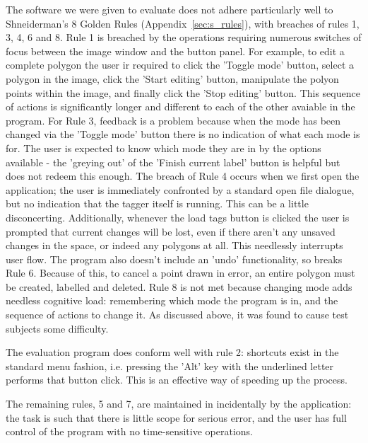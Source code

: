 \documentclass[a4paper,11pt,oneside]{article}
\begin{document}
The software we were given to evaluate does not adhere particularly well to Shneiderman's 8 Golden Rules (Appendix~\ref{sec:s_rules}), with breaches of rules 1, 3, 4, 6 and 8. Rule 1 is breached by the operations requiring numerous switches of focus between the image window and the button panel. For example, to edit a complete polygon the user ir required to click the 'Toggle mode' button, select a polygon in the image, click the 'Start editing' button, manipulate the polyon points within the image, and finally click the 'Stop editing' button. This sequence of actions is significantly longer and different to each of the other avaiable in the program. For Rule 3, feedback is a problem because when the mode has been changed via the 'Toggle mode' button there is no indication of what each mode is for. The user is expected to know which mode they are in by the options available - the 'greying out' of the 'Finish current label' button is helpful but does not redeem this enough. The breach of Rule 4 occurs when we first open the application; the user is immediately confronted by a standard open file dialogue, but no indication that the tagger itself is running. This can be a little disconcerting. Additionally, whenever the load tags button is clicked the user is prompted that current changes will be lost, even if there aren't any unsaved changes in the space, or indeed any polygons at all. This needlessly interrupts user flow. The program also doesn't include an 'undo' functionality, so breaks Rule 6. Because of this, to cancel a point drawn in error, an entire polygon must be created, labelled and deleted. Rule 8 is not met because changing mode adds needless cognitive load: remembering which mode the program is in, and the sequence of actions to change it. As discussed above, it was found to cause test subjects some difficulty.

The evaluation program does conform well with rule 2: shortcuts exist in the standard menu fashion, i.e. pressing the 'Alt' key with the underlined letter performs that button click. This is an effective way of speeding up the process.

The remaining rules, 5 and 7, are maintained in incidentally by the application: the task is such that there is little scope for serious error, and the user has full control of the program with no time-sensitive operations.
\end{document}
